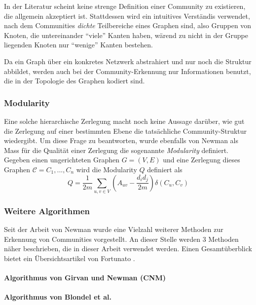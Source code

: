 In der Literatur scheint keine strenge Definition einer Community zu
existieren, die allgemein akzeptiert ist. Stattdessen wird ein
intuitives Verst\"andis verwendet, nach dem Communities \emph{dichte}
Teilbereiche eines Graphen sind, also Gruppen von Knoten, die
untereinander ``viele'' Kanten haben, w\"arend zu nicht in der Gruppe
liegenden Knoten nur ``wenige'' Kanten bestehen.

Da ein Graph \"uber ein konkretes Netzwerk abstrahiert und nur noch
die Struktur abbildet, werden auch bei der Community-Erkennung nur
Informationen benutzt, die in der Topologie des Graphen kodiert sind. 

\cite{Girvan2002}

\subsubsection{Modularity}
\label{sec:modularity}

Eine solche hierarchische Zerlegung macht noch keine Aussage
dar\"uber, wie gut die Zerlegung auf einer bestimmten Ebene die
tats\"achliche Community-Struktur wiedergibt. Um diese Frage zu
beantworten, wurde ebenfalls von Newman als Mass f\"ur die Qualit\"at
einer Zerlegung die sogenannte \emph{Modularity} definiert. Gegeben
einen ungerichteten Graphen $G=(V, E)$ und eine Zerlegung dieses
Graphen $\mathcal{C} = C_1, ..., C_n$ wird die Modularity $Q$
definiert als
\begin{equation}
  \label{eq:modularity}
  Q =
  \frac{1}{2m}\sum_{u, v \in V}\left(A_{uv}-\frac{d_id_j}{2m}\right)\delta(C_u, C_v)
\end{equation}

\subsubsection{Weitere Algorithmen}
\label{sec:algorithmen}

Seit der Arbeit von Newman wurde eine Vielzahl weiterer Methoden zur
Erkennung von Communities vorgestellt. An dieser Stelle werden 3
Methoden n\"aher beschrieben, die in dieser Arbeit verwendet
werden. Einen Gesamt\"uberblick bietet ein \"Ubersichtsartikel von
Fortunato \cite{Fortunato2010}.

\paragraph{Algorithmus von Girvan und Newman (CNM)}
\label{sec:algor-von-girv}

\paragraph{Algorithmus von Blondel et al.}
\label{sec:algor-von-blond}


